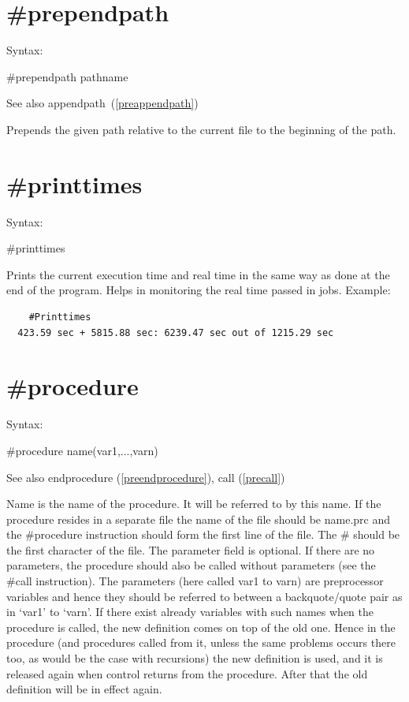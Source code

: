  
\section{\#prependpath}
\label{preprependpath}

\noindent Syntax:

\#prependpath pathname

\noindent See also appendpath~(\ref{preappendpath})

\noindent Prepends the given path relative to the current file to the beginning
of the \FORM{} path.

 
\section{\#printtimes}
\label{preprinttimes}

\noindent Syntax:

\#printtimes

\noindent Prints the current execution time and real 
time in the same way as done at the end of the program. Helps in monitoring 
the real time passed in \TFORM{} jobs.
Example:
\begin{verbatim}
    #Printtimes
  423.59 sec + 5815.88 sec: 6239.47 sec out of 1215.29 sec
\end{verbatim}


\section{\#procedure}
\label{preprocedure}

\noindent Syntax:

\#procedure name(var1,...,varn)
 
\noindent See also endprocedure (\ref{preendprocedure}), call
(\ref{precall})

\noindent Name is the name of the 
procedure. It will be referred to by this name. If the 
procedure resides in a separate file the name of the file should be 
name.prc and the \#procedure instruction should form the first line of the 
file. The \# should be the first character of the file. The parameter field 
is optional. If there are no parameters, the procedure should also be 
called without parameters (see the \#call instruction). The parameters 
(here called var1 to varn) are preprocessor variables and hence they should 
be referred to between a backquote/quote pair 
as in `var1' to `varn'. If there exist already variables with such names 
when the procedure is called, the new definition comes on top of the old 
one. Hence in the procedure (and procedures called from it, unless the same 
problems occurs there too, as would be the case with recursions) the new 
definition is used, and it is released again when control returns from the 
procedure. After that the old definition will be in effect again.

